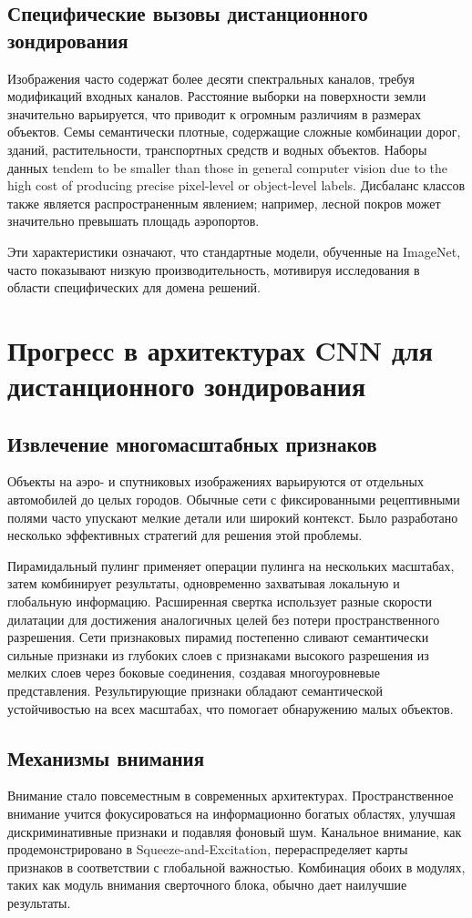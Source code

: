 \documentclass[12pt,a4paper]{article}
\begin{document}
\subsection{Специфические вызовы дистанционного зондирования}
Изображения часто содержат более десяти спектральных каналов, требуя модификаций входных каналов. Расстояние выборки на поверхности земли значительно варьируется, что приводит к огромным различиям в размерах объектов. Семы семантически плотные, содержащие сложные комбинации дорог, зданий, растительности, транспортных средств и водных объектов. Наборы данных tendem to be smaller than those in general computer vision due to the high cost of producing precise pixel-level or object-level labels. Дисбаланс классов также является распространенным явлением; например, лесной покров может значительно превышать площадь аэропортов.

Эти характеристики означают, что стандартные модели, обученные на ImageNet, часто показывают низкую производительность, мотивируя исследования в области специфических для домена решений.

\section{Прогресс в архитектурах CNN для дистанционного зондирования}
\label{sec:developments}
\subsection{Извлечение многомасштабных признаков}
Объекты на аэро- и спутниковых изображениях варьируются от отдельных автомобилей до целых городов. Обычные сети с фиксированными рецептивными полями часто упускают мелкие детали или широкий контекст. Было разработано несколько эффективных стратегий для решения этой проблемы.

Пирамидальный пулинг применяет операции пулинга на нескольких масштабах, затем комбинирует результаты, одновременно захватывая локальную и глобальную информацию. Расширенная свертка использует разные скорости дилатации для достижения аналогичных целей без потери пространственного разрешения. Сети признаковых пирамид постепенно сливают семантически сильные признаки из глубоких слоев с признаками высокого разрешения из мелких слоев через боковые соединения, создавая многоуровневые представления. Результирующие признаки обладают семантической устойчивостью на всех масштабах, что помогает обнаружению малых объектов.

\subsection{Механизмы внимания}
Внимание стало повсеместным в современных архитектурах. Пространственное внимание учится фокусироваться на информационно богатых областях, улучшая дискриминативные признаки и подавляя фоновый шум. Канальное внимание, как продемонстрировано в Squeeze-and-Excitation, перераспределяет карты признаков в соответствии с глобальной важностью. Комбинация обоих в модулях, таких как модуль внимания сверточного блока, обычно дает наилучшие результаты.
\end{document}
